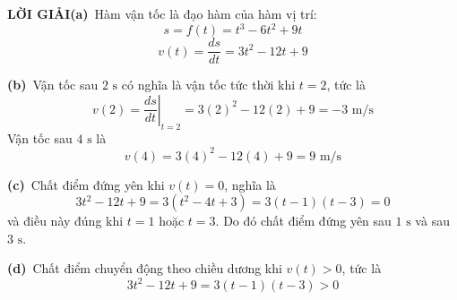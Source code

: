 \vspace{0.5em}
{\color{stewartblue}\textbf{\textsf{LỜI GIẢI}}}\hspace{0.8em}\textbf{(a)}~Hàm vận tốc là đạo hàm của hàm vị trí:
\[
s = f(t) = t^3 - 6t^2 + 9t
\]
\[
v(t) = \frac{ds}{dt} = 3t^2 - 12t + 9
\]

\textbf{(b)}~Vận tốc sau $2\text{ s}$ có nghĩa là vận tốc tức thời khi $t = 2$, tức là
\[
v(2) = \left.\frac{ds}{dt}\right|_{t=2} = 3(2)^2 - 12(2) + 9 = -3\text{ m/s}
\]
Vận tốc sau $4\text{ s}$ là
\[
v(4) = 3(4)^2 - 12(4) + 9 = 9\text{ m/s}
\]

\textbf{(c)}~Chất điểm đứng yên khi $v(t) = 0$, nghĩa là
\[
3t^2 - 12t + 9 = 3(t^2 - 4t + 3) = 3(t - 1)(t - 3) = 0
\]
và điều này đúng khi $t = 1$ hoặc $t = 3$. Do đó chất điểm đứng yên sau $1\text{ s}$ và sau $3\text{ s}$.

\textbf{(d)}~Chất điểm chuyển động theo chiều dương khi $v(t) > 0$, tức là
\[
3t^2 - 12t + 9 = 3(t - 1)(t - 3) > 0
\]
